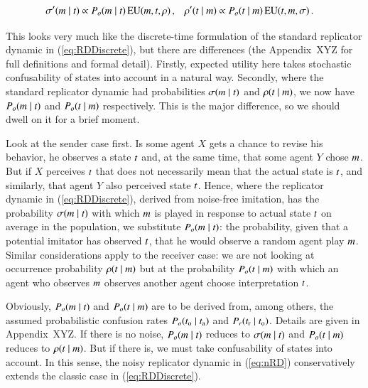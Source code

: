 \documentclass[fleqn,reqno,10pt]{article}
\begin{document}
\begin{align}
  \label{eq:nRD}
  \sigma'(m \mid t) & \propto P_o(m \mid t) \thinspace \mathrm{EU}(m,
  t, \rho)\,, & \rho'(t \mid m) & \propto P_o(t \mid m)
  \thinspace \mathrm{EU}(t, m, \sigma)\,.
\end{align}

\noindent This looks very much like the discrete-time formulation of the standard replicator
dynamic in (\ref{eq:RDDiscrete}), but there are differences (the Appendix~XYZ for full
definitions and formal detail). Firstly, expected utility here takes stochastic confusability
of states into account in a natural way. Secondly, where the standard replicator dynamic had
probabilities $\sigma(m \mid t)$ and $\rho(t \mid m)$, we now
have $P_o(m \mid t)$ and $P_o(t \mid m)$ respectively. This is the
major difference, so we should dwell on it for a brief moment.

Look at the sender case first. Is some agent $X$ gets a chance to revise his behavior, he
observes a state $t$ and, at the same time, that some agent $Y$ chose $m$. But if $X$
perceives $t$ that does not necessarily mean that the actual state is $t$, and
similarly, that agent $Y$ also perceived state $t$. Hence, where the replicator dynamic in
(\ref{eq:RDDiscrete}), derived from noise-free imitation, has the probability
$\sigma(m \mid t)$ with which $m$ is played in response to actual state
$t$ on average in the population, we substitute $P_o(m \mid t)$: the
probability, given that a potential imitator has observed $t$, that he would observe a
random agent play $m$. Similar considerations apply to the receiver case: we are not
looking at occurrence probability $\rho(t \mid m)$ but at the probability
$P_o(t \mid m)$ with which an agent who observes $m$ observes another agent
choose interpretation $t$.

Obviously, $P_o(m \mid t)$ and $P_o(t \mid m)$ are to be derived
from, among others, the assumed probabilistic confusion rates
$P_o(t_{\mathrm{o}} \mid t_{\mathrm{a}})$ and $P_r(t_{\mathrm{r}} \mid t_{\mathrm{o}})$. Details
are given in Appendix~XYZ. If there is no noise, $P_o(m \mid t)$ reduces to
$\sigma(m \mid t)$ and $P_o(t \mid m)$ reduces to
$\rho(t \mid m)$. But if there is, we must take
confusability of states into account. In this sense, the noisy replicator dynamic in
(\ref{eq:nRD}) conservatively extends the classic case in (\ref{eq:RDDiscrete}).
\end{document}
